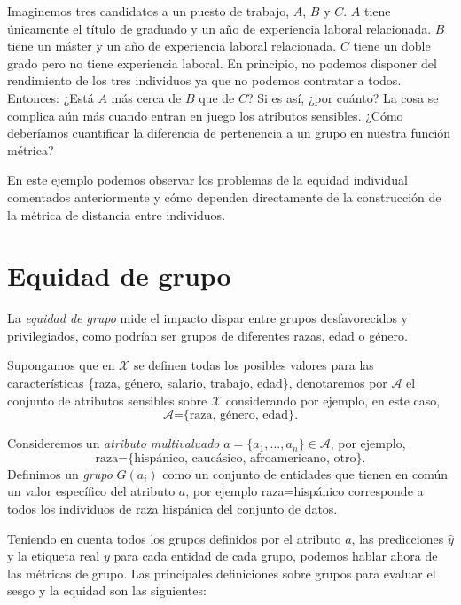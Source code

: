 \documentclass[oneside,openright,titlepage,numbers=noenddot,openany,headinclude,footinclude=true,
cleardoublepage=empty,abstractoff,BCOR=5mm,paper=a4,fontsize=12pt,main=spanish]{scrreprt}
\begin{document}
\begin{example}
Imaginemos tres candidatos a un puesto de trabajo, $A$, $B$ y $C$. $A$ tiene únicamente el título de graduado y un año de experiencia laboral relacionada. $B$ tiene un máster y un año de experiencia laboral relacionada. $C$ tiene un doble grado pero no tiene experiencia laboral. En principio, no podemos disponer del rendimiento de los tres individuos ya que no podemos contratar a todos. Entonces: ¿Está $A$ más cerca de $B$ que de $C$? Si es así, ¿por cuánto? La cosa se complica aún más cuando entran en juego los atributos sensibles. ¿Cómo deberíamos cuantificar la diferencia de pertenencia a un grupo en nuestra función métrica?

En este ejemplo podemos observar los problemas de la equidad individual comentados anteriormente y cómo dependen directamente de la construcción de la métrica de distancia entre individuos.
\end{example}

\section{Equidad de grupo}

La \textit{equidad de grupo} mide el impacto dispar entre grupos desfavorecidos y privilegiados, como podrían ser grupos de diferentes razas, edad o género.

Supongamos que en $\mathcal{X}$ se definen todas los posibles valores para las características \{raza, género, salario, trabajo, edad\}, denotaremos por $\mathcal{A}$ el conjunto de atributos sensibles sobre $\mathcal{X}$ considerando por ejemplo, en este caso, $$\mathcal{A}\text{=\{raza, género, edad\}}.$$

Consideremos un \textit{atributo multivaluado} $a = \{a_1,\dots,a_n\} \in \mathcal{A}$, por ejemplo, $$\text{raza=\{hispánico, caucásico, afroamericano, otro\}}.$$ Definimos un \textit{grupo} $G(a_i)$
como un conjunto de entidades que tienen en común un valor específico
del atributo $a$, por ejemplo raza=hispánico corresponde a todos los individuos de raza hispánica del
conjunto de datos.

Teniendo en cuenta todos los grupos definidos por el atributo $a$, las predicciones $\hat{y}$ y la etiqueta real $y$ para cada entidad de cada grupo, podemos hablar
ahora de las métricas de grupo. Las principales definiciones sobre grupos para
evaluar el sesgo y la equidad son las siguientes:
\end{document}
